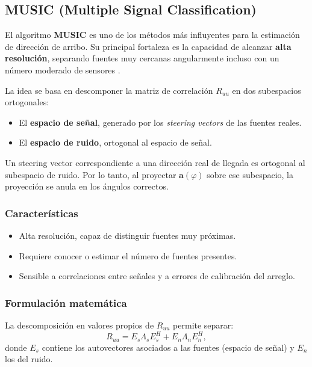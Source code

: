 \subsection{MUSIC (Multiple Signal Classification)}\label{sec:doa:music}

El algoritmo \textbf{MUSIC} es uno de los métodos más influyentes para la estimación de dirección de arribo.  
Su principal fortaleza es la capacidad de alcanzar \textbf{alta resolución}, separando fuentes muy cercanas angularmente incluso con un número moderado de sensores \cite{Gupta2015}.  

La idea se basa en descomponer la matriz de correlación $R_{uu}$ en dos subespacios ortogonales:
\begin{itemize}
	\item El \textbf{espacio de señal}, generado por los \emph{steering vectors} de las fuentes reales.
	\item El \textbf{espacio de ruido}, ortogonal al espacio de señal.
\end{itemize}

Un steering vector correspondiente a una dirección real de llegada es ortogonal al subespacio de ruido.  
Por lo tanto, al proyectar $\mathbf{a}(\varphi)$ sobre ese subespacio, la proyección se anula en los ángulos correctos.

\subsubsection*{Características}
\begin{itemize}
	\item Alta resolución, capaz de distinguir fuentes muy próximas.  
	\item Requiere conocer o estimar el número de fuentes presentes.  
	\item Sensible a correlaciones entre señales y a errores de calibración del arreglo.  
\end{itemize}

\subsubsection*{Formulación matemática}

La descomposición en valores propios de $R_{uu}$ permite separar:
\begin{equation}
	R_{uu} = E_s \Lambda_s E_s^H + E_n \Lambda_n E_n^H,
\end{equation}
donde $E_s$ contiene los autovectores asociados a las fuentes (espacio de señal) y $E_n$ los del ruido.

